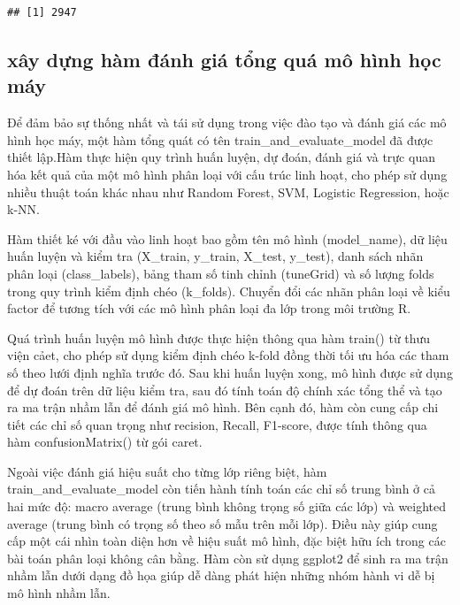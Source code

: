 \documentclass[
]{article}
\begin{document}
\begin{verbatim}
## [1] 2947
\end{verbatim}

\subsection{xây dựng hàm đánh giá tổng quá mô hình học
máy}\label{xuxe2y-dux1ef1ng-huxe0m-ux111uxe1nh-giuxe1-tux1ed5ng-quuxe1-muxf4-huxecnh-hux1ecdc-muxe1y}

Để đảm bảo sự thống nhất và tái sử dụng trong việc đào tạo và đánh giá
các mô hình học máy, một hàm tổng quát có tên
train\_and\_evaluate\_model đã được thiết lập.Hàm thực hiện quy trình
huấn luyện, dự đoán, đánh giá và trực quan hóa kết quả của một mô hình
phân loại với cấu trúc linh hoạt, cho phép sử dụng nhiều thuật toán khác
nhau như Random Forest, SVM, Logistic Regression, hoặc k-NN.

Hàm thiết ké với đầu vào linh hoạt bao gồm tên mô hình (model\_name), dữ
liệu huấn luyện và kiểm tra (X\_train, y\_train, X\_test, y\_test), danh
sách nhãn phân loại (class\_labels), bảng tham số tinh chỉnh (tuneGrid)
và số lượng folds trong quy trình kiểm định chéo (k\_folds). Chuyển đổi
các nhãn phân loại về kiểu factor để tương tích với các mô hình phân
loại đa lớp trong môi trường R.

Quá trình huấn luyện mô hình được thực hiện thông qua hàm train() từ
thưu viện cảet, cho phép sử dụng kiểm định chéo k-fold đồng thời tối ưu
hóa các tham số theo lưới định nghĩa trước đó. Sau khi huấn luyện xong,
mô hình được sử dụng để dự đoán trên dữ liệu kiểm tra, sau đó tính toán
độ chính xác tổng thể và tạo ra ma trận nhầm lẫn để đánh giá mô hình.
Bên cạnh đó, hàm còn cung cấp chi tiết các chỉ số quan trọng như
recision, Recall, F1-score, được tính thông qua hàm confusionMatrix() từ
gói caret.

Ngoài việc đánh giá hiệu suất cho từng lớp riêng biệt, hàm
train\_and\_evaluate\_model còn tiến hành tính toán các chỉ số trung
bình ở cả hai mức độ: macro average (trung bình không trọng số giữa các
lớp) và weighted average (trung bình có trọng số theo số mẫu trên mỗi
lớp). Điều này giúp cung cấp một cái nhìn toàn diện hơn về hiệu suất mô
hình, đặc biệt hữu ích trong các bài toán phân loại không cân bằng. Hàm
còn sử dụng ggplot2 để sinh ra ma trận nhầm lẫn dưới dạng đồ họa giúp dễ
dàng phát hiện những nhóm hành vi dễ bị mô hình nhầm lẫn.
\end{document}
